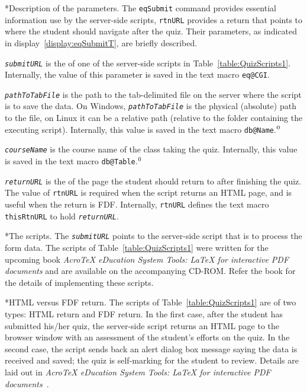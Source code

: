 \documentclass{article}
\makeatletter
\def\AEBBook{\textsl{{Acro\!\TeX} eDucation System Tools: {\LaTeX} for interactive PDF documents}}
\let\bslash=\@backslashchar
\renewcommand{\paragraph}
    {\@startsection{paragraph}{4}{0pt}{6pt}{-3pt}
    {\normalfont\normalsize\bfseries}}
\def\cs#1{\texttt{\bslash#1}}
\def\meta#1{\textit{\texttt{#1}}}
\let\app\textsf
\def\HTML{HTML}\def\FDF{FDF}
\makeatother
\begin{document}
\paragraph*{Description of the parameters.} The \cs{eqSubmit} command provides essential
information use by the server-side scripts, \cs{rtnURL} provides a return
{\URL} that points to where the student should navigate after the quiz.
Their parameters, as indicated in display~\eqref{display:eqSubmitT}, are briefly described.
\begin{description}
\item\meta{submitURL} is the {\URL} of one of the server-side scripts in
    Table~\ref{table:QuizScripts1}. Internally, the value of this parameter
    is saved in the text macro \cs{eq@CGI}.

\item\meta{pathToTabFile} is the path to the tab-delimited file on the
    server where the script is to save the data. On \app{Windows},
    \meta{pathToTabFile} is the physical (absolute) path to the file, on
    \app{Linux} it can be a relative path (relative to the folder containing
    the executing script). Internally, this value is saved in the text macro
    \cs{db@Name}.${}^\text{\fnNameChoice}$

\item\meta{courseName} is the course name of the class taking the quiz.
    Internally, this value is saved in the text macro
    \cs{db@Table}.${}^\text{\fnNameChoice}$

\item\meta{returnURL} is the {\URL} of the page the student should return
    to after finishing the quiz. The value of \cs{rtnURL} is required when
    the script returns an {\HTML} page, and is useful when the return is
    {\FDF}. Internally, \cs{rtnURL} defines the text macro \cs{thisRtnURL}
    to hold \meta{returnURL}.
\end{description}

\paragraph*{The scripts.} The \meta{submitURL} points to the server-side script that is to process the form data.
The scripts of Table~\ref{table:QuizScripts1} were written for the upcoming book
{\AEBBook} and are available on the accompanying CD-ROM. Refer the book for the details of
implementing these scripts.

\paragraph*{HTML versus FDF return.} The scripts of Table~\ref{table:QuizScripts1} are of two types:
HTML return and FDF return. In the first case, after the student has submitted his/her quiz,
the server-side script returns an HTML page to the browser window with an assessment of the
student's efforts on the quiz. In the second case, the script sends back an alert dialog box message saying
the data is received and saved; the quiz is self-marking for the student to review.
Details are laid out in {\AEBBook}~\cite{book:AEBB}.
\end{document}
